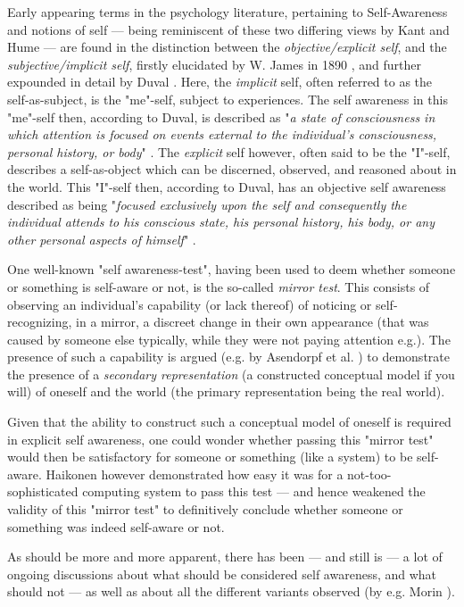 	Early appearing terms in the psychology literature, pertaining to Self-Awareness and notions of self — being reminiscent of these two differing views by Kant and Hume — are found in the distinction between the \textit{objective/explicit self}, and the \textit{subjective/implicit self}, firstly elucidated by W. James in 1890 \cite{principles_of_psychology_james}, and further expounded in detail by Duval \cite{duval1972theory}. Here, the \textit{implicit} self, often referred to as the self-as-subject, is the "me"-self, subject to experiences. The self awareness in this "me"-self then, according to Duval, is described as "\textit{a state of consciousness in which attention is focused on events external to the individual's consciousness, personal history, or body}" \cite{duval1972theory}. The \textit{explicit} self however, often said to be the "I"-self, describes a self-as-object which can be discerned, observed, and reasoned about in the world. This "I"-self then, according to Duval, has an objective self awareness described as being "\textit{focused exclusively upon the self and consequently the individual attends to his conscious state, his personal history, his body, or any other personal aspects of himself}" \cite{duval1972theory}.

	One well-known "self awareness-test", having been used to deem whether someone or something is self-aware or not, is the so-called \textit{mirror test}. This consists of observing an individual's capability (or lack thereof) of noticing or self-recognizing, in a mirror, a discreet change in their own appearance (that was caused by someone else typically, while they were not paying attention e.g.). The presence of such a capability is argued (e.g. by Asendorpf et al. \cite{asendorpf1996self}) to demonstrate the presence of a \textit{secondary representation} (a constructed conceptual model if you will) of oneself and the world (the primary representation being the real world). 

	Given that the ability to construct such a conceptual model of oneself is required in explicit self awareness, one could wonder whether passing this "mirror test" would then be satisfactory for someone or something (like a system) to be self-aware. Haikonen \cite{haikonen2007reflections} however demonstrated how easy it was for a not-too-sophisticated computing system to pass this test — and hence weakened the validity of this "mirror test" to definitively conclude whether someone or something was indeed self-aware or not.

	As should be more and more apparent, there has been — and still is — a lot of ongoing discussions about what should be considered self awareness, and what should not — as well as about all the different variants observed (by e.g. Morin \cite{morin2006levels}).


